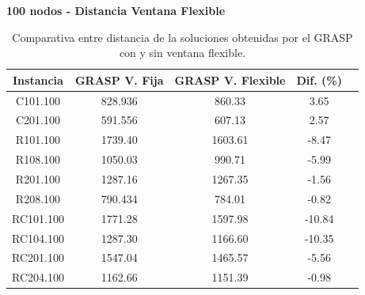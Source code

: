 \documentclass{article}
\begin{document}
  \begin{table}[h!]
    \centering
    \caption*{{\bf 100 nodos - Distancia Ventana Flexible}}
    \begin{tabular}{ccccc}
      \toprule
      Instancia & GRASP V. Fija & GRASP V. Flexible & Dif. (\%) \\
      \midrule
      C101.100  & 828.936 &  860.33 &   3.65 \\
      C201.100  & 591.556 &  607.13 &   2.57 \\
      R101.100  & 1739.40 & 1603.61 &  -8.47 \\
      R108.100  & 1050.03 &  990.71 &  -5.99 \\
      R201.100  & 1287.16 & 1267.35 &  -1.56 \\
      R208.100  & 790.434 &  784.01 &  -0.82 \\ 
      RC101.100 & 1771.28 & 1597.98 & -10.84 \\
      RC104.100 & 1287.30 & 1166.60 & -10.35 \\
      RC201.100 & 1547.04 & 1465.57 &  -5.56 \\
      RC204.100 & 1162.66 & 1151.39 &  -0.98 \\
      \bottomrule
    \end{tabular}
    \caption{Comparativa entre distancia de la soluciones obtenidas por el GRASP con y sin ventana flexible.}\label{table:res100nodesflexibledistance}
  \end{table}
\end{document}
